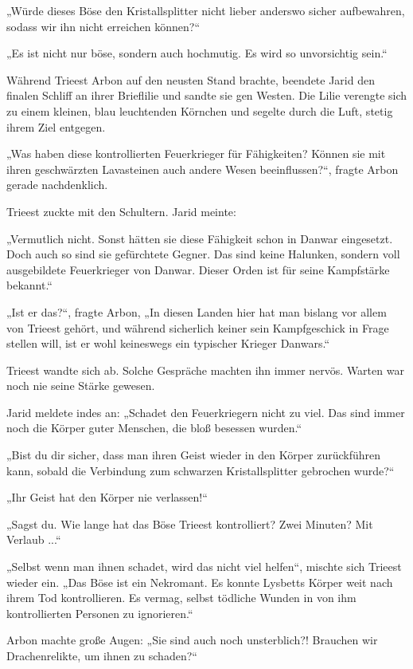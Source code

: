 „Würde dieses Böse den Kristallsplitter nicht lieber anderswo sicher aufbewahren, sodass wir ihn nicht erreichen können?“

„Es ist nicht nur böse, sondern auch hochmutig. Es wird so unvorsichtig sein.“

Während Trieest Arbon auf den neusten Stand brachte, beendete Jarid den finalen Schliff an ihrer Brieflilie und sandte sie gen Westen. Die Lilie verengte sich zu einem kleinen, blau leuchtenden Körnchen und segelte durch die Luft, stetig ihrem Ziel entgegen.

„Was haben diese kontrollierten Feuerkrieger für Fähigkeiten? Können sie mit ihren geschwärzten Lavasteinen auch andere Wesen beeinflussen?“, fragte Arbon gerade nachdenklich.

Trieest zuckte mit den Schultern. Jarid meinte:

„Vermutlich nicht. Sonst hätten sie diese Fähigkeit schon in Danwar eingesetzt. Doch auch so sind sie gefürchtete Gegner. Das sind keine Halunken, sondern voll ausgebildete Feuerkrieger von Danwar. Dieser Orden ist für seine Kampfstärke bekannt.“

„Ist er das?“, fragte Arbon, „In diesen Landen hier hat man bislang vor allem von Trieest gehört, und während sicherlich keiner sein Kampfgeschick in Frage stellen will, ist er wohl keineswegs ein typischer Krieger Danwars.“

Trieest wandte sich ab. Solche Gespräche machten ihn immer nervös. Warten war noch nie seine Stärke gewesen.

Jarid meldete indes an: „Schadet den Feuerkriegern nicht zu viel. Das sind immer noch die Körper guter Menschen, die bloß besessen wurden.“

„Bist du dir sicher, dass man ihren Geist wieder in den Körper zurückführen kann, sobald die Verbindung zum schwarzen Kristallsplitter gebrochen wurde?“

„Ihr Geist hat den Körper nie verlassen!“

„Sagst du. Wie lange hat das Böse Trieest kontrolliert? Zwei Minuten? Mit Verlaub ...“

„Selbst wenn man ihnen schadet, wird das nicht viel helfen“, mischte sich Trieest wieder ein. „Das Böse ist ein Nekromant. Es konnte Lysbetts Körper weit nach ihrem Tod kontrollieren. Es vermag, selbst tödliche Wunden in von ihm kontrollierten Personen zu ignorieren.“

Arbon machte große Augen: „Sie sind auch noch unsterblich?! Brauchen wir Drachenrelikte, um ihnen zu schaden?“

